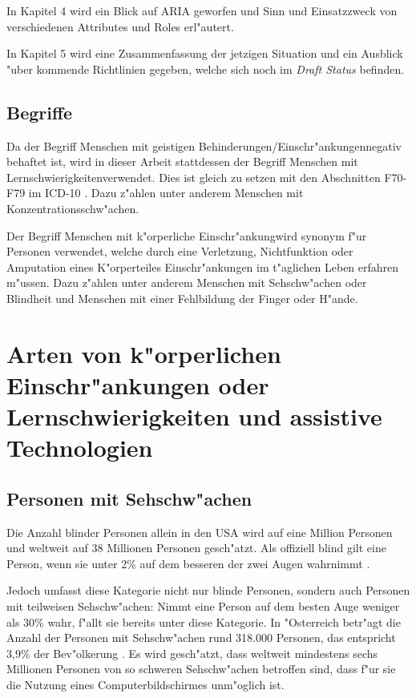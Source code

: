 \documentclass[a4paper,bibtotoc,oneside]{scrbook}
\begin{document}
In Kapitel 4 wird ein Blick auf ARIA geworfen und Sinn und Einsatzzweck von verschiedenen Attributes und Roles erl"autert.

In Kapitel 5 wird eine Zusammenfassung der jetzigen Situation und ein Ausblick "uber kommende Richtlinien gegeben, welche sich noch im \emph{Draft Status} befinden.

\section{Begriffe}
Da der Begriff \glqq Menschen mit geistigen Behinderungen/Einschr"ankungen\grqq negativ behaftet ist, wird in dieser Arbeit stattdessen der Begriff \glqq Menschen mit Lernschwierigkeiten\grqq  verwendet. Dies ist gleich zu setzen mit den Abschnitten F70-F79 im ICD-10 \cite{icd10}. Dazu z"ahlen unter anderem Menschen mit Konzentrationsschw"achen.


Der Begriff \glqq Menschen mit k"orperliche Einschr"ankung\grqq wird synonym f"ur Personen verwendet, welche durch eine Verletzung, Nichtfunktion oder Amputation eines K"orperteiles Einschr"ankungen im t"aglichen Leben erfahren m"ussen. Dazu z"ahlen unter anderem Menschen mit Sehschw"achen oder Blindheit und Menschen mit einer Fehlbildung der Finger oder H"ande.

\chapter{Arten von k"orperlichen Einschr"ankungen oder Lernschwierigkeiten
 und assistive Technologien}

\section{Personen mit Sehschw"achen}
Die Anzahl blinder Personen allein in den USA wird auf eine Million Personen und weltweit auf 38 Millionen Personen gesch"atzt\cite[S. 1]{screen_read}.  Als offiziell blind gilt eine Person, wenn sie unter 2\% auf dem besseren der zwei Augen wahrnimmt \cite[S. 12]{understand_acc}. 

Jedoch umfasst diese Kategorie nicht nur blinde Personen, sondern auch Personen mit teilweisen Sehschw"achen: Nimmt eine Person auf dem besten Auge weniger als 30\% wahr, f"allt sie bereits unter diese Kategorie\cite[S. 12]{understand_acc}. In "Osterreich betr"agt die Anzahl der Personen mit Sehschw"achen rund 318.000 Personen, das entspricht 3,9\% der Bev"olkerung \cite[S. 13]{stat_austria}. Es wird gesch"atzt, dass weltweit mindestens sechs Millionen Personen von so schweren Sehschw"achen betroffen sind, dass f"ur sie die Nutzung eines Computerbildschirmes unm"oglich ist\cite[S. 249]{screen_read_frust}.
\end{document}
